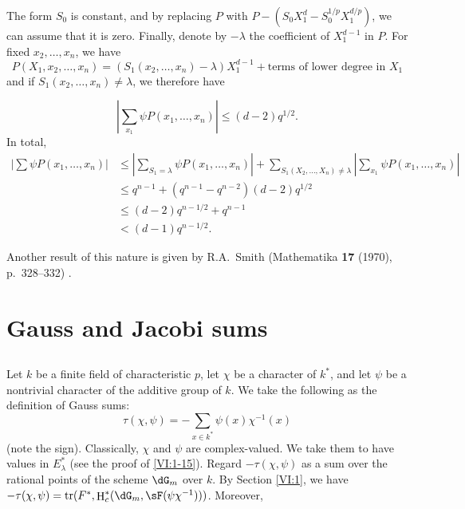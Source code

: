 \documentclass[oneside]{book}
\DeclareMathOperator{\h}{H}
\DeclareMathOperator{\tr}{tr}
\newcounter{char}
\theoremstyle{sga-source}
\theoremstyle{sga-source-dash}
\theoremstyle{sga-source-dotdash}
\theoremstyle{sga-source-number-note-dash}
\theoremstyle{sga-source-note-number-dotdash}
\theoremstyle{sga-source-example-dotdash}
\theoremstyle{sga-source-inline-number}
\theoremstyle{sga-source-bare-number}
\theoremstyle{sga-source}
\newcommand{\PrintPage}[1]{}\newcommand{\MathPage}[1]{}\newcommand{\PrintCite}[2]{#1}\newcommand{\var}[3]{#2}
\begin{document}
The form $S_0$ is constant, and by replacing $P$ with 
$P-(S_0 X_1^d -S_0^{1/p} X_1^{d/p})$, we can assume that it is zero. 
Finally, denote by $-\lambda$ the coefficient of $X_1^{d-1}$ in $P$. For fixed 
$x_2,\dots,x_n$, we have 
\[
  P(X_1,x_2,\dots,x_n) = (S_1(x_2,\dots,x_n)-\lambda) X_1^{d-1} + \text{terms of lower degree in $X_1$} 
\]
and if $S_1(x_2,\dots,x_n)\ne \lambda$, we therefore have 
\PrintPage{195}
\[
  \left| \sum_{x_1} \psi P(x_1,\dots,x_n)\right| \leqslant (d-2) q^{1/2} \text{.} 
\]
In total, 
\begin{align*}
  \left|\sum \psi P(x_1,\dots,x_n)\right| 
    &\leqslant \var{\left.}{\left|}{S45-SOL-0794}\var{\sum_{S=\lambda}}{\sum_{S_1=\lambda}}{S45-SOL-0795} \psi P(x_1,\dots,x_n)\right| + \var{\sum_{S(X_2,\dots,X_n)\ne\lambda}}{\sum_{S_1(X_2,\dots,X_n)\ne\lambda}}{S45-SOL-0796} \left| \sum_{x_1} \psi P(x_1,\dots,x_n)\right| \\
    &\leqslant q^{n-1} + (q^{n-1}-q^{n-2})(d-2) q^{1/2} \\
    &\var{< (d-2) q^{n-1/2} + q^{n-1}}{\leqslant (d-2) q^{n-1/2} + q^{n-1}}{S45-SOL-0797} \\
    &< (d-1) q^{n-1/2} \text{.}
\end{align*}

Another result of this nature is given by R.A.\ Smith 
(Mathematika \textbf{17} (1970), p.~328--332) \cite{sm70}. 










\PrintPage{196}
\section{Gauss and Jacobi sums}\label{VI:4}





\subsection{}\label{VI:4-1}

Let $k$ be a finite field of characteristic $p$, let $\chi$ be a character of 
$k^\ast$, and let $\psi$ be a nontrivial character of the additive group of $k$. 
We take the following as the definition of Gauss sums: 
\begin{equation*}\tag{4.1.1}\label{VI:eq:4-1-1}
  \tau(\chi,\psi) = -\sum_{x\in k^\ast} \psi(x) \chi^{-1}(x) 
\end{equation*}
(note the sign). Classically, $\chi$ and $\psi$ are complex-valued. 
We take them to have values in $E_\lambda^\ast$ (see the proof of 
\ref{VI:1-15}). Regard $-\tau(\chi,\psi)$ as a sum over the rational 
points of the scheme $\dG_m$ over $k$. By Section \ref{VI:1}, 
we have $-\tau(\chi,\psi) = \var{\tr(F^\ast,\h_c^\ast(\dG_m,\sF(\psi \chi^{-1}))}{\tr(F^\ast,\h_c^\ast(\dG_m,\sF(\psi \chi^{-1})))}{S45-SOL-0799}$. Moreover,
\end{document}
